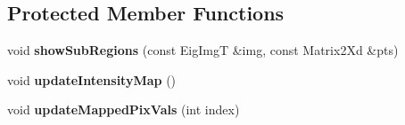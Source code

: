 \subsection*{Protected Member Functions}
\begin{DoxyCompactItemize}
\item 
\hypertarget{classLSCV_aab3ec73d40606ad71908722b694bdfd1}{void {\bfseries show\-Sub\-Regions} (const Eig\-Img\-T \&img, const Matrix2\-Xd \&pts)}\label{classLSCV_aab3ec73d40606ad71908722b694bdfd1}

\item 
\hypertarget{classLSCV_a42ad49247e89642faeaed9467924f4cf}{void {\bfseries update\-Intensity\-Map} ()}\label{classLSCV_a42ad49247e89642faeaed9467924f4cf}

\item 
\hypertarget{classLSCV_ad23ae0ada21afb0762468eda7b329dec}{void {\bfseries update\-Mapped\-Pix\-Vals} (int index)}\label{classLSCV_ad23ae0ada21afb0762468eda7b329dec}

\end{DoxyCompactItemize}
